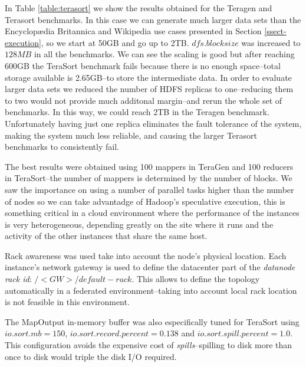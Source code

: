 

In Table \ref{table:terasort} we show the results obtained for the Teragen and Terasort benchmarks. In this case we can generate much larger data sets than the Encyclop{\ae}dia Britannica and Wikipedia use cases presented in Section \ref{ssect-execution}, so we start at 50GB and go up to 2TB. $dfs.blocksize$ was increased to $128MB$ in all the benchmarks. We can see the scaling is good but after reaching 600GB the TeraSort benchmark fails because there is no enough space--total storage available is 2.65GB--to store the intermediate data. In order to evaluate larger data sets we reduced the number of HDFS replicas to one--reducing them to two would not provide much additonal margin--and rerun the whole set of benchmarks. In this way, we could reach 2TB in the Teragen benchmark. Unfortunately having just one replica eliminates the fault tolerance of the system, making the system much less reliable, and causing the larger Terasort benchmarks to consistently fail. 

The best results were obtained using 100 mappers in TeraGen and 100 reducers in TeraSort--the number of mappers is determined by the number of blocks. We saw the importance on using a number of parallel tasks higher than the number of nodes so we can take advantadge of Hadoop's speculative execution, this is something critical in a cloud environment where the performance of the instances is very heterogeneous, depending greatly on the site where it runs and the activity of the other instances that share the same host.

Rack awareness was used take into account the node's physical location. Each instance's network gateway is used to define the datacenter part of the \emph{datanode rack id}: $/<GW>/default-rack$. This allows to define the topology automatically in a federated environment--taking into account local rack location is not feasible in this environment.

The MapOutput in-memory buffer was also especifically tuned for TeraSort using $io.sort.mb=150$, $io.sort.record.percent=0.138$ and $io.sort.spill.percent=1.0$. This configuration avoids the expensive cost of \emph{spills}--spilling to disk more than once to disk would triple the disk I/O required. 

